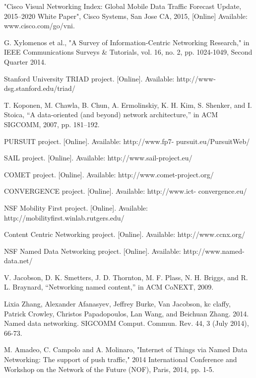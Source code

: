 \documentclass[11pt,conference]{./IEEEtran}
\begin{document}
\begin{thebibliography}{99}

"Cisco Visual Networking Index: Global Mobile Data Traffic Forecast
Update, 2015–2020 White Paper", Cisco Systems, San Jose CA, 2015,
[Online] Available: www.cisco.com/go/vni.

G. Xylomenos et al., "A Survey of Information-Centric Networking
Research," in IEEE Communications Surveys \& Tutorials, vol. 16, no. 2,
pp. 1024-1049, Second Quarter 2014.

Stanford University TRIAD project. [Online]. Available: http://www-
dsg.stanford.edu/triad/

T. Koponen, M. Chawla, B. Chun, A. Ermolinskiy, K. H. Kim,
S. Shenker, and I. Stoica, “A data-oriented (and beyond) network
architecture,” in ACM SIGCOMM, 2007, pp. 181–192.

PURSUIT project. [Online]. Available: http://www.fp7-
pursuit.eu/PursuitWeb/

SAIL project. [Online]. Available: http://www.sail-project.eu/

COMET project. [Online]. Available: http://www.comet-project.org/

CONVERGENCE project. [Online]. Available: http://www.ict-
convergence.eu/

NSF Mobility First project. [Online]. Available:
http://mobilityfirst.winlab.rutgers.edu/

Content Centric Networking project.
[Online]. Available:
http://www.ccnx.org/

NSF Named Data Networking project. [Online]. Available:
http://www.named-data.net/

V. Jacobson, D. K. Smetters, J. D. Thornton, M. F. Plass, N. H. Briggs,
and R. L. Braynard, “Networking named content,” in ACM CoNEXT,
2009.

Lixia Zhang, Alexander Afanasyev, Jeffrey Burke, Van Jacobson, kc
claffy, Patrick Crowley, Christos Papadopoulos, Lan Wang, and
Beichuan Zhang. 2014. Named data networking. SIGCOMM Comput.
Commun. Rev. 44, 3 (July 2014), 66-73.

M. Amadeo, C. Campolo and A. Molinaro, "Internet of Things via Named Data Networking: The support of push traffic," 2014 International Conference and Workshop on the Network of the Future (NOF), Paris, 2014, pp. 1-5.


\end{thebibliography}
\end{document}
